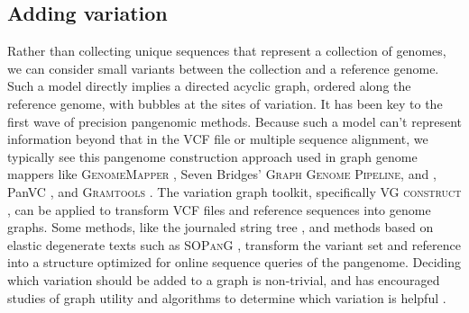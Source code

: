 
\subsection{Adding variation}

Rather than collecting unique sequences that represent a collection of genomes, we can consider small variants between the collection and a reference genome.
Such a model directly implies a directed acyclic graph, ordered along the reference genome, with bubbles at the sites of variation.
It has been key to the first wave of precision pangenomic methods.
Because such a model can't represent information beyond that in the VCF file or multiple sequence alignment, we typically see this pangenome construction approach used in graph genome mappers like \textsc{GenomeMapper} \cite{Schneeberger_2009}, Seven Bridges' \textsc{Graph Genome Pipeline}, and \cite{Rakocevic_2019}, PanVC \cite{Valenzuela_2018}, and \textsc{Gramtools} \cite{Maciuca_2016}.
The variation graph toolkit, specifically \textsc{VG construct} \cite{Garrison_2018}, can be applied to transform VCF files and reference sequences into genome graphs.
Some methods, like the journaled string tree \cite{Rahn_2014}, and methods based on elastic degenerate texts \cite{Bernardini_2019} such as \textsc{SOPanG} \cite{Cis_ak_2018}, transform the variant set and reference into a structure optimized for online sequence queries of the pangenome.
Deciding which variation should be added to a graph is non-trivial, and has encouraged studies of graph utility \cite{Novak_2017a} and algorithms to determine which variation is helpful \cite{Pritt_2018}.





